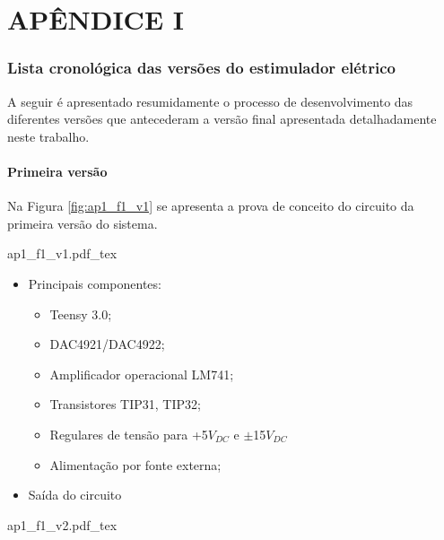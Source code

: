 \chapter{APÊNDICE I}\label{ap:ap1}

\subsection*{Lista cronológica das versões do estimulador elétrico}

A seguir é apresentado resumidamente o processo de desenvolvimento das diferentes versões que antecederam a versão final apresentada detalhadamente neste trabalho.

\subsubsection*{Primeira versão}
Na Figura \ref{fig:ap1_f1_v1} se apresenta a prova de conceito do circuito da primeira versão do sistema.

\begin{figure*}[h]
    \centering %
    \small %
    \def\svgwidth{0.9\columnwidth}%
    {ap1_f1_v1.pdf_tex}
    \caption{Versão em placa de prototipagem da primeira versão do sistema.}
    \label{fig:ap1_f1_v1}
\end{figure*}

\begin{itemize}
    \item Principais componentes:
    \begin{itemize}
        \item Teensy 3.0;
        \item DAC4921/DAC4922;
        \item Amplificador operacional LM741;
        \item Transistores TIP31, TIP32;
        \item Regulares de tensão para +5$V_{DC}$ e $\mathrm{\pm}$15$V_{DC}$
        \item Alimentação por fonte externa;
    \end{itemize}
\end{itemize}

\begin{itemize}
    \item Saída do circuito
\end{itemize}

\begin{figure*}[h]
    \centering %
    \small %
    \def\svgwidth{0.5\columnwidth}%
    {ap1_f1_v2.pdf_tex}
    \caption{Estímulo elétrico criado pela primeira versão do sistema.}
    \label{fig:ap1_f1_v2}
\end{figure*}

